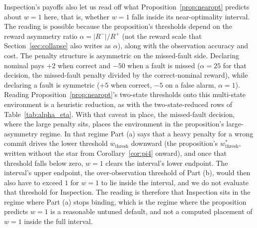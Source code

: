Inspection's payoffs also let us read off what Proposition~\ref{prop:nearopt} predicts about $w{=}1$ here, that is, whether $w{=}1$ falls inside its near-optimality interval. The reading is possible because the proposition's thresholds depend on the reward asymmetry ratio $\alpha = |R^-|/R^+$ (not the reward scale that Section~\ref{sec:collapse} also writes as $\alpha$), along with the observation accuracy and cost. The penalty structure is asymmetric on the missed-fault side. Declaring nominal pays $+2$ when correct and $-50$ when a fault is missed ($\alpha = 25$ for that decision, the missed-fault penalty divided by the correct-nominal reward), while declaring a fault is symmetric ($+5$ when correct, $-5$ on a false alarm, $\alpha = 1$). Reading Proposition~\ref{prop:nearopt}'s two-state thresholds onto this multi-state environment is a heuristic reduction, as with the two-state-reduced rows of Table~\ref{tab:alpha_eta}. With that caveat in place, the missed-fault decision, where the large penalty sits, places the environment in the proposition's large-asymmetry regime. In that regime Part (a) says that a heavy penalty for a wrong commit drives the lower threshold $w_{\mathrm{thresh}}$ downward (the proposition's $w^*_{\mathrm{thresh}}$, written without the star from Corollary~\ref{cor:pi4} onward), and once that threshold falls below zero, $w{=}1$ clears the interval's lower endpoint. The interval's upper endpoint, the over-observation threshold of Part (b), would then also have to exceed $1$ for $w{=}1$ to lie inside the interval, and we do not evaluate that threshold for Inspection. The reading is therefore that Inspection sits in the regime where Part (a) stops binding, which is the regime where the proposition predicts $w{=}1$ is a reasonable untuned default, and not a computed placement of $w{=}1$ inside the full interval.
